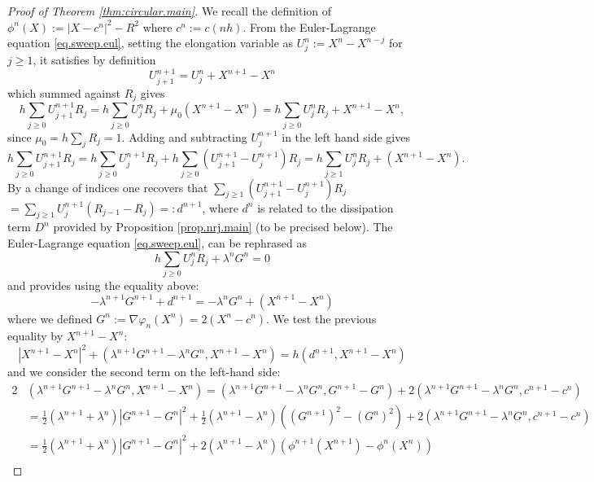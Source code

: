 \documentclass[]{jnsao}
\renewcommand{\tr}{R}
\begin{document}
\begin{proof}[Proof of Theorem \ref{thm:circular.main}]
 	We recall the definition of $\phi^n(X):= |X - c^n|^2 - R^2$ where $c^n:= c(nh)$.
 	From the Euler-Lagrange equation \eqref{eq.sweep.eul}, setting the elongation variable as 
 	$U^n_j:= X^n-X^{n-j}$ for $j\geq 1$, it  satisfies by definition 
 	$$
 	U^{n+1}_{j+1} = U^n_j + X^{n+1} - X^n 
 	$$
 	which summed against $\tr_j$ gives
 	\begin{equation}\label{eq:inner.prod}
 		h \sum_{j\geq 0} U^{n+1}_{j+1} \tr_j = h \sum_{j\geq 0} U^n_j \tr_j + \mu_{0} (X^{n+1}-X^n) = 
 		h \sum	_{j\geq 0} U^n_j \tr_j + X^{n+1}-X^n , 
 	\end{equation}
 	since $\mu_0 = h \sum_j \tr_j =1$. 
 	Adding and subtracting $U^{n+1}_j$ in the left hand side gives
 	$$
 	h \sum_{j\geq 0} U^{n+1}_{j+1} \tr_j = h \sum_{j\geq 0} U^{n+1}_j \tr_j + h \sum_{j\geq 0} (U^{n+1}_{j+1}-U^{n+1}_j) \tr_j 
 	= h \sum_{j\geq 1} U^{n}_j \tr_j + (X^{n+1}-X^n).					
 	$$
 	By a change of indices one recovers that $  \sum_{j\geq 1} (U^{n+1}_{j+1}-U^{n+1}_j) \tr_j $ $= \sum_{j\geq 1} 
 	U^{n+1}_j(\tr_{j-1}-\tr_{j}) =: d^{n+1}$,  where $d^{n}$ is related to the dissipation term $D^n$
 	provided by Proposition \ref{prop.nrj.main} (to be precised below).
 	The Euler-Lagrange equation \eqref{eq.sweep.eul},
 	can be rephrased as 
 	$$
 	h \sum_{j\ge 0 } U^{n}_j \tr_{j}+ \lambda^n G^n = 0
 	$$
 	and provides using the equality above:
 	$$
 	-\lambda^{n+1} G^{n+1} +  d^{n+1} =  -\lambda^n G^n + (X^{n+1}-X^n)
 	$$	
 	where we defined $G^n:= \nabla \varphi_n (X^n) = 2(X^n - c^n)$.
 	We test the previous equality by $X^{n+1}-X^n$:
 	$$
 	|X^{n+1}-X^n|^2 + \left( \lambda^{n+1}  G^{n+1} - \lambda^n G^n, X^{n+1}-X^n \right) 
 	=  h \left( d^{n+1}, X^{n+1}-X^n \right)
 	$$
 	and we consider the second term on the left-hand side:
 	$$
 	\begin{aligned}
 		2 & \left(\lambda^{n+1}  G^{n+1} - \lambda^n G^n, X^{n+1}-X^n \right)  = 
 		 \left(\lambda^{n+1}  G^{n+1} - \lambda^n G^n, G^{n+1}-G^n \right) + 2 \left(\lambda^{n+1}  G^{n+1} - \lambda^n G^n, c^{n+1}-c^n \right) \\
 		& = \frac{1}{2} \left( \lambda^{n+1}+ \lambda^{n}\right) | G^{n+1}-G^n |^2 
 		+ \frac{1}{2} (\lambda^{n+1}- \lambda^{n}) ((G^{n+1})^2 - (G^n)^2) 
 		+
 		2 \left(\lambda^{n+1}  G^{n+1} - \lambda^n G^n, c^{n+1}-c^n \right)	 \\
 		& = \frac{1}{2} \left( \lambda^{n+1}+ \lambda^{n}\right) | G^{n+1}-G^n |^2 
 		+ 2 (\lambda^{n+1}- \lambda^{n}) (\phi^{n+1}(X^{n+1}) - \phi^n(X^n)) \\

\end{aligned}$$
\end{proof}
\end{document}
